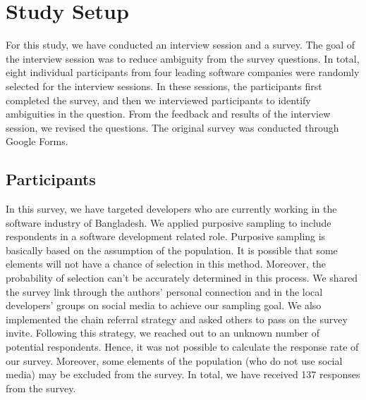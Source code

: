 \section{Study Setup}
\label{study_setup}

For this study, we have conducted an interview session and a survey. The goal of the interview session was to reduce ambiguity from the survey questions. In total, eight individual participants from four leading software companies were randomly selected for the interview sessions. In these sessions, the participants first completed the survey, and then we interviewed participants to identify ambiguities in the question. From the feedback and results of the interview session, we revised the questions. The original survey was conducted through Google Forms.

\subsection{Participants}
\label{survey_participants}
In this survey, we have targeted developers who are currently working in the software industry of Bangladesh. We applied purposive sampling\cite{Vogt2005} to include respondents in a software development related role. Purposive sampling is basically based on the assumption of the population. It is possible that some elements will not have a chance of selection in this method. Moreover, the probability of selection can't be accurately determined in this process.  We shared the survey link through the authors' personal connection and in the local developers' groups on social media to achieve our sampling goal. We also implemented the chain referral strategy\cite{creswell2013} and asked others to pass on the survey invite. Following this strategy, we reached out to an unknown number of potential respondents. Hence, it was not possible to calculate the response rate of our survey. Moreover, some elements of the population (who do not use social media) may be excluded from the survey. In total, we have received 137 responses from the survey. 

